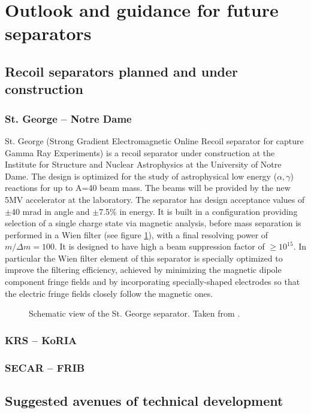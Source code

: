 \section{Outlook and guidance for future separators}

\subsection{Recoil separators planned and under construction}
\subsubsection{St. George -- Notre Dame}

St. George (Strong Gradient Electromagnetic Online Recoil separator for capture Gamma Ray Experiments) \cite{cou08} is a recoil separator under construction at the Institute for Structure and Nuclear Astrophysics at the University of Notre Dame. The design is optimized for the study of astrophysical low energy ($\alpha,\gamma$) reactions for up to A=40 beam mass. The beams will be provided by the new 5MV accelerator at the laboratory. The separator has design acceptance values of $\pm$40 mrad in angle and $\pm$7.5\% in energy. It is built in a configuration providing selection of a single charge state via magnetic analysis, before mass separation is performed in a Wien filter (see figure \ref{fig:stgeorge}), with a final resolving power of $m/\Delta m=100$. It is designed to have high a beam suppression factor of $\ge10^{15}$. In particular the Wien filter element of this separator is specially optimized to improve the filtering efficiency, achieved by minimizing the magnetic dipole component fringe fields and by incorporating specially-shaped electrodes so that the electric fringe fields closely follow the magnetic ones. 

\begin{figure}
\caption{Schematic view of the St. George separator. Taken from \cite{cou08}.}
\label{fig:stgeorge}
\end{figure}

\subsubsection{KRS -- KoRIA}
\subsubsection{SECAR -- FRIB}

\subsection{Suggested avenues of technical development} 
